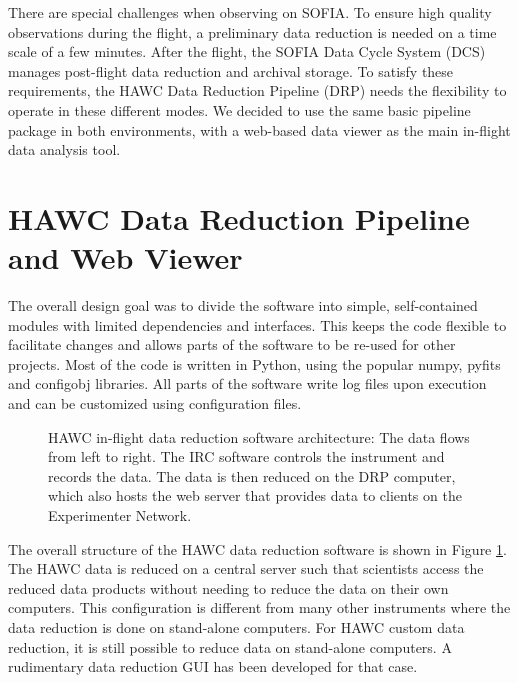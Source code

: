\documentclass[11pt,twoside]{article}
\begin{document}
There are special challenges when observing on SOFIA. To ensure high
quality observations during the flight, a preliminary data reduction
is needed on a time scale of a few minutes. After the flight, the
SOFIA Data Cycle System (DCS) \citep[see][]{P050_adassxxii} manages
post-flight data reduction and archival storage. To satisfy these
requirements, the HAWC Data Reduction Pipeline (DRP) needs the
flexibility to operate in these different modes. We decided to use the
same basic pipeline package in both environments, with a web-based data
viewer as the main in-flight data analysis tool.

\section{HAWC Data Reduction Pipeline and Web Viewer}

The overall design goal was to divide the software into simple,
self-contained modules with limited dependencies and interfaces. This
keeps the code flexible to facilitate changes and allows parts of the
software to be re-used for other projects. Most of the code is written
in Python, using the popular numpy, pyfits and configobj
libraries. All parts of the software write log files upon execution
and can be customized using configuration files.

\begin{figure}

\caption{HAWC in-flight data reduction software architecture: The data
  flows from left to right. The IRC software controls the instrument
  and records the data. The data is then reduced on the DRP computer,
  which also hosts the web server that provides data to clients on the
  Experimenter Network.}

\label{fig_struct}

\end{figure}

The overall structure of the HAWC data reduction software is shown in
Figure \ref{fig_struct}. The HAWC data is reduced on a central server
such that scientists access the reduced data products without needing
to reduce the data on their own computers. This configuration is
different from many other instruments where the data reduction is done
on stand-alone computers. For HAWC custom data reduction, it is still
possible to reduce data on stand-alone computers. A rudimentary data
reduction GUI has been developed for that case.
\end{document}
